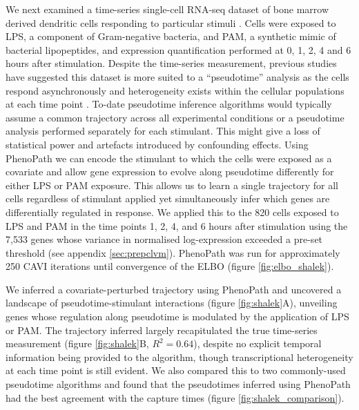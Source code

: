 We next examined a time-series single-cell RNA-seq dataset of bone marrow derived dendritic cells responding to particular stimuli \cite{Shalek2014-cg}. Cells were exposed to LPS, a component of Gram-negative bacteria, and PAM, a synthetic mimic of bacterial lipopeptides, and expression quantification performed at 0, 1, 2, 4 and 6 hours after stimulation. Despite the time-series measurement, previous studies have suggested this dataset is more suited to a ``pseudotime'' analysis as the cells respond asynchronously and heterogeneity exists within the cellular populations at each time point \cite{Reid2016-yo}. To-date pseudotime inference algorithms would typically assume a common trajectory across all experimental conditions or a pseudotime analysis  performed separately for each stimulant. This might give a loss of statistical power and artefacts introduced by confounding effects. Using PhenoPath we can encode the stimulant to which the cells were exposed as a covariate and allow gene expression to evolve along pseudotime differently for either LPS or PAM exposure. This allows us to learn a single trajectory for all cells regardless of stimulant applied yet simultaneously infer which genes are differentially regulated in response. We applied this to the 820 cells exposed to LPS and PAM in the time points 1, 2, 4, and 6 hours after stimulation using the 7,533 genes whose variance in normalised log-expression exceeded a pre-set threshold (see appendix \ref{sec:prepclvm}). PhenoPath was run for approximately 250 CAVI iterations until convergence of the ELBO (figure \ref{fig:elbo_shalek}).

We inferred a covariate-perturbed trajectory using PhenoPath and uncovered a landscape of pseudotime-stimulant interactions (figure \ref{fig:shalek}A), unveiling genes whose regulation along pseudotime is modulated by the application of LPS or PAM. The trajectory inferred largely recapitulated the true time-series measurement (figure \ref{fig:shalek}B, $R^2 = 0.64$), despite no explicit temporal information being provided to the algorithm, though transcriptional heterogeneity at each time point is still evident. We also compared this to two commonly-used pseudotime algorithms and found that the pseudotimes inferred using PhenoPath had the best agreement with the capture times (figure \ref{fig:shalek_comparison}).


